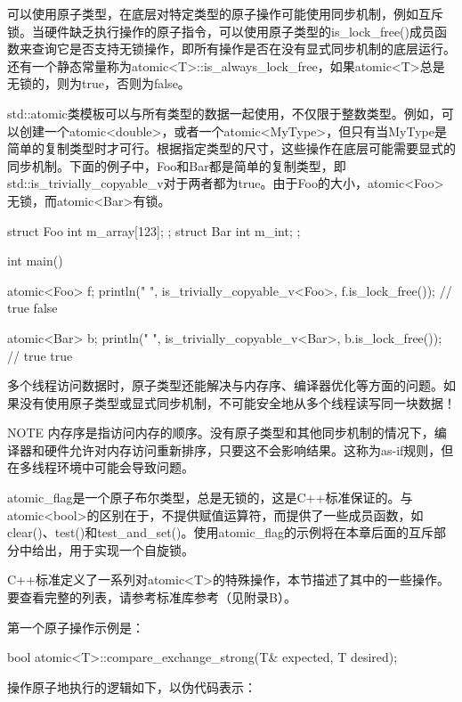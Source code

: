 可以使用原子类型，在底层对特定类型的原子操作可能使用同步机制，例如互斥锁。当硬件缺乏执行操作的原子指令，可以使用原子类型的is\_lock\_free()成员函数来查询它是否支持无锁操作，即所有操作是否在没有显式同步机制的底层运行。还有一个静态常量称为atomic<T>::is\_always\_lock\_free，如果atomic<T>总是无锁的，则为true，否则为false。

std::atomic类模板可以与所有类型的数据一起使用，不仅限于整数类型。例如，可以创建一个atomic<double>，或者一个atomic<MyType>，但只有当MyType是简单的复制类型时才可行。根据指定类型的尺寸，这些操作在底层可能需要显式的同步机制。下面的例子中，Foo和Bar都是简单的复制类型，即std::is\_trivially\_copyable\_v对于两者都为true。由于Foo的大小，atomic<Foo>无锁，而atomic<Bar>有锁。

\begin{cpp}
struct Foo { int m_array[123]; };
struct Bar { int m_int; };

int main()
{
    atomic<Foo> f;
    println("{} {}", is_trivially_copyable_v<Foo>, f.is_lock_free()); // true false

    atomic<Bar> b;
    println("{} {}", is_trivially_copyable_v<Bar>, b.is_lock_free()); // true true
}
\end{cpp}

多个线程访问数据时，原子类型还能解决与内存序、编译器优化等方面的问题。如果没有使用原子类型或显式同步机制，不可能安全地从多个线程读写同一块数据！

\begin{myNotic}{NOTE}
内存序是指访问内存的顺序。没有原子类型和其他同步机制的情况下，编译器和硬件允许对内存访问重新排序，只要这不会影响结果。这称为as-if规则，但在多线程环境中可能会导致问题。
\end{myNotic}

atomic\_flag是一个原子布尔类型，总是无锁的，这是C++标准保证的。与atomic<bool>的区别在于，不提供赋值运算符，而提供了一些成员函数，如clear()、test()和test\_and\_set()。使用atomic\_flag的示例将在本章后面的互斥部分中给出，用于实现一个自旋锁。


C++标准定义了一系列对atomic<T>的特殊操作，本节描述了其中的一些操作。要查看完整的列表，请参考标准库参考（见附录B）。

第一个原子操作示例是：

\begin{cpp}
bool atomic<T>::compare_exchange_strong(T& expected, T desired);
\end{cpp}

操作原子地执行的逻辑如下，以伪代码表示：

